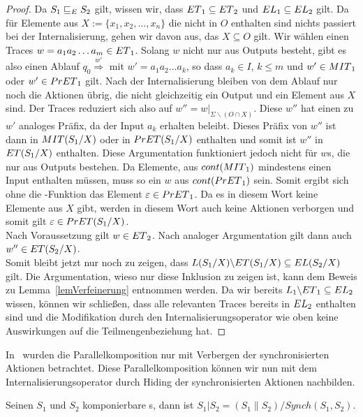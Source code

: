 \begin{proof}
  Da $S_1\sqsubseteq _E S_2$ gilt, wissen wir, dass $ET{}_1\subseteq ET{}_2$ und
  $EL{}_1\subseteq EL{}_2$ gilt. Da für Elemente aus $X:=\{x_1,x_2,\dots
  ,x_n\}$ die nicht in $O$ enthalten sind nichts passiert bei der
  Internalisierung, gehen wir davon aus, das $X\subseteq O$ gilt. Wir wählen
  einen Traces $w=a_1a_2\dots a_m\in ET{}_1$. Solang $w$ nicht nur aus Outputs
  besteht, gibt es also einen Ablauf $q_0 \overset{w'}{\Rightarrow}$ mit
  $w'=a_1a_2\dots a_k$, so dass $a_k\in I$, $k\leq m$ und $w'\in MIT{}_1$ oder
  $w'\in PrET{}_1$ gilt. Nach der Internalisierung bleiben von dem Ablauf nur
  noch die Aktionen übrig, die nicht gleichzeitig ein Output und ein Element
  aus $X$ sind. Der Traces reduziert sich also auf $w''=w|_{\Sigma\backslash
  (O\cap X)}$. Diese $w''$ hat einen zu $w'$ analoges Präfix, da der Input
  $a_k$ erhalten beleibt. Dieses Präfix von $w''$ ist dann in $MIT{}(S_1/X)$
  oder in $PrET{}(S_1/X)$ enthalten und somit ist $w''$ in $ET{}(S_1/X)$
  enthalten. Diese Argumentation funktioniert jedoch nicht für $w$s, die nur
  aus Outputs bestehen. Da Elemente, aus $cont{}(MIT{}_1)$ mindestens einen
  Input enthalten müssen, muss so ein $w$ aus $cont{}(PrET{}_1)$ sein. Somit
  ergibt sich ohne die \cont{}-Funktion das Element $\varepsilon\in PrET{}_1$.
  Da es in diesem Wort keine Elemente aus $X$ gibt, werden in diesem Wort auch
  keine Aktionen verborgen und somit gilt $\varepsilon\in PrET{}(S_1/X)$.\\
  Nach Voraussetzung gilt $w\in ET{}_2$. Nach analoger Argumentation gilt dann
  auch $w''\in ET{}(S_2/X)$.\\
  Somit bleibt jetzt nur noch zu zeigen, dass $L(S_1/X)\backslash ET{}(S_1/X)
  \subseteq EL(S_2/X)$ gilt. Die Argumentation, wieso nur diese Inklusion zu
  zeigen ist, kann dem Beweis zu Lemma~\ref{lemVerfeinerung} entnommen werden.
  Da wir bereits $L_1\backslash ET{}_1\subseteq EL{}_2$ wissen, können wir
  schließen, dass alle relevanten Traces bereits in $EL{}_2$ enthalten sind
  und die Modifikation durch den Internalisierungsoperator wie oben keine
  Auswirkungen auf die Teilmengenbeziehung hat.
\end{proof}

In~\cite{Vogler2014EIO} wurden die Parallelkomposition nur mit Verbergen der
synchronisierten Aktionen betrachtet. Diese Parallelkomposition können wir nun
mit dem Internalisierungsoperator durch Hiding der synchronisierten Aktionen
nachbilden.

\begin{Def}
  \label{defIntParal}
  Seinen $S_1$ und $S_2$ komponierbare \EIO{}s, dann ist
  $S_1|S_2=(S_1\|S_2)/Synch(S_1,S_2)$.
\end{Def}

